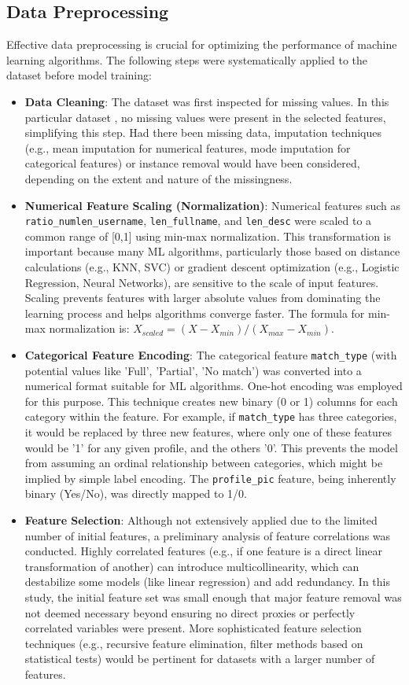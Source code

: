 \documentclass[conference]{IEEEtran}
\begin{document}
\subsection{Data Preprocessing}
Effective data preprocessing is crucial for optimizing the performance of machine learning algorithms. The following steps were systematically applied to the dataset before model training:
\begin{itemize}
    \item \textbf{Data Cleaning}: The dataset was first inspected for missing values. In this particular dataset \cite{b5}, no missing values were present in the selected features, simplifying this step. Had there been missing data, imputation techniques (e.g., mean imputation for numerical features, mode imputation for categorical features) or instance removal would have been considered, depending on the extent and nature of the missingness.
    \item \textbf{Numerical Feature Scaling (Normalization)}: Numerical features such as \texttt{ratio\_numlen\_username}, \texttt{len\_fullname}, and \texttt{len\_desc} were scaled to a common range of [0,1] using min-max normalization. This transformation is important because many ML algorithms, particularly those based on distance calculations (e.g., KNN, SVC) or gradient descent optimization (e.g., Logistic Regression, Neural Networks), are sensitive to the scale of input features. Scaling prevents features with larger absolute values from dominating the learning process and helps algorithms converge faster. The formula for min-max normalization is: $X_{scaled} = (X - X_{min}) / (X_{max} - X_{min})$.
    \item \textbf{Categorical Feature Encoding}: The categorical feature \texttt{match\_type} (with potential values like 'Full', 'Partial', 'No match') was converted into a numerical format suitable for ML algorithms. One-hot encoding was employed for this purpose. This technique creates new binary (0 or 1) columns for each category within the feature. For example, if \texttt{match\_type} has three categories, it would be replaced by three new features, where only one of these features would be '1' for any given profile, and the others '0'. This prevents the model from assuming an ordinal relationship between categories, which might be implied by simple label encoding. The \texttt{profile\_pic} feature, being inherently binary (Yes/No), was directly mapped to 1/0.
    \item \textbf{Feature Selection}: Although not extensively applied due to the limited number of initial features, a preliminary analysis of feature correlations was conducted. Highly correlated features (e.g., if one feature is a direct linear transformation of another) can introduce multicollinearity, which can destabilize some models (like linear regression) and add redundancy. In this study, the initial feature set was small enough that major feature removal was not deemed necessary beyond ensuring no direct proxies or perfectly correlated variables were present. More sophisticated feature selection techniques (e.g., recursive feature elimination, filter methods based on statistical tests) would be pertinent for datasets with a larger number of features.
\end{itemize}
\end{document}
